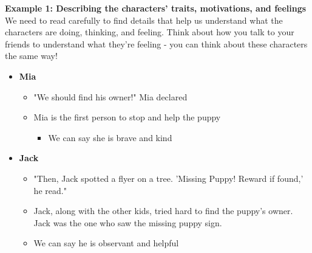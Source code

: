 \documentclass[12pt]{article}
\begin{document}
\begin{tcolorbox}[colframe=black!60, colback=white, 
coltitle=black, colbacktitle=black!15, fonttitle=\bfseries\Large, 
title=Examples, halign title=center, left=10pt, right=10pt, top=10pt, bottom=15pt]

\textbf{Example 1: Describing the characters' traits, motivations, and feelings}
We need to read carefully to find details that help us understand what the characters are doing, thinking, and feeling. Think about how you talk to your friends to understand what they're feeling - you can think about these characters the same way!
\begin{itemize}
    \item \textbf{Mia}
    \begin{itemize}
        \item "We should find his owner!" Mia declared
        \item Mia is the first person to stop and help the puppy
        \begin{itemize}
            \item We can say she is brave and kind
        \end{itemize}
    \end{itemize}
\item \textbf{Jack}
    \begin{itemize}
        \item "Then, Jack spotted a flyer on a tree. 'Missing Puppy! Reward if found,' he read."
    \end{itemize}
    \begin{itemize}
        \item Jack, along with the other kids, tried hard to find the puppy's owner. Jack was the one who saw the missing puppy sign.
    \end{itemize}
    \begin{itemize}
      
            \item We can say he is observant and helpful
     

\end{itemize}
\end{itemize}
\end{tcolorbox}
\end{document}
